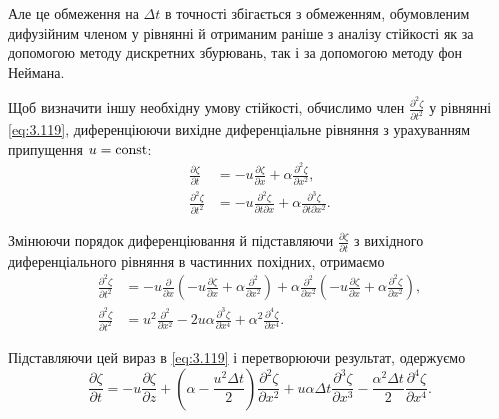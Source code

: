 Але це обмеження на $\Delta t$ в точності збігається з обмеженням, обумовленим дифузійним членом у рівнянні й отриманим раніше з аналізу стійкості як за допомогою методу дискретних збурювань, так і за допомогою методу фон Неймана. \medskip

Щоб визначити іншу необхідну умову стійкості, обчислимо член $\frac{\partial^2 \zeta}{\partial t^2}$ у рівнянні \eqref{eq:3.119}, диференціюючи вихідне диференціальне рівняння з урахуванням припущення $u = \operatorname{const}$:
\begin{align}
 	\label{eq:3.121}
 	\frac{\partial \zeta}{\partial t} &= -u\frac{\partial \zeta}{\partial x} + \alpha\frac{\partial^2 \zeta}{\partial x^2}, \\
 	\label{eq:3.122}
 	\frac{\partial^2 \zeta}{\partial t^2} &= -u\frac{\partial^2 \zeta}{\partial t \partial x} + \alpha\frac{\partial^3 \zeta}{\partial t \partial x^2}.
\end{align}

Змінюючи порядок диференціювання й підставляючи $\frac{\partial \zeta}{\partial t}$ з вихідного диференціального рівняння в частинних похідних,
отримаємо
\begin{align}
    \label{eq:3.123}
    \frac{\partial^2 \zeta}{\partial t^2} &= - u \frac{\partial}{\partial x} \left( -u\frac{\partial \zeta}{\partial x} + \alpha \frac{\partial^2}{\partial x^2} \right) + \alpha \frac{\partial^2}{\partial x^2} \left( - u \frac{\partial \zeta}{\partial x} + \alpha \frac{\partial^2 \zeta}{\partial x^2}\right), \\
 	\label{eq:3.124}
    \frac{\partial^2 \zeta}{\partial t^2} &= u^2 \frac{\partial^2}{\partial x^2} -2u\alpha \frac{\partial^3 \zeta}{\partial x^4} + \alpha^2 \frac{\partial^4 \zeta}{\partial x^4}.
\end{align}

Підставляючи цей вираз в \eqref{eq:3.119} і перетворюючи результат, одержуємо
\begin{equation}
    \label{eq:3.125}
    \frac{\partial \zeta}{\partial t} = -u \frac{\partial \zeta}{\partial z} + \left( \alpha - \frac{u^2 \Delta t}{2} \right) \frac{\partial^2 \zeta}{\partial x^2} + u \alpha \Delta t \frac{\partial^3 \zeta}{\partial x^3} - \frac{\alpha^2 \Delta t}{2} \frac{\partial^4 \zeta}{\partial x^4}.
\end{equation}

